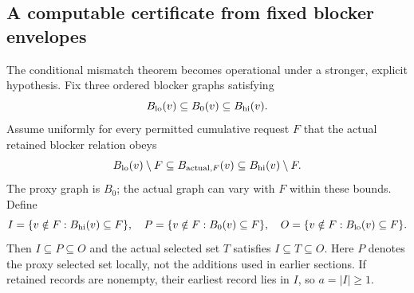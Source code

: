 \documentclass[11pt,a4paper]{article}
\theoremstyle{definition}\newtheorem{definition}[theorem]{Definition}
\newcommand{\minus}{\setminus}
\begin{document}
\subsection{A computable certificate from fixed blocker envelopes}\label{sec:envelopes}
The conditional mismatch theorem becomes operational under a stronger, explicit hypothesis. Fix three ordered blocker graphs satisfying
\[
 B_{\rm lo}(v)\subseteq B_0(v)\subseteq B_{\rm hi}(v).
\]
Assume uniformly for every permitted cumulative request $F$ that the actual retained blocker relation obeys
\[
 B_{\rm lo}(v)\minus F\subseteq B_{{\rm actual},F}(v)
 \subseteq B_{\rm hi}(v)\minus F.
\]
The proxy graph is $B_0$; the actual graph can vary with $F$ within these bounds. Define
\[
 I=\{v\notin F:B_{\rm hi}(v)\subseteq F\},\quad
 P=\{v\notin F:B_0(v)\subseteq F\},\quad
 O=\{v\notin F:B_{\rm lo}(v)\subseteq F\}.
\]
Then $I\subseteq P\subseteq O$ and the actual selected set $T$ satisfies $I\subseteq T\subseteq O$. Here $P$ denotes the proxy selected set locally, not the additions used in earlier sections. If retained records are nonempty, their earliest record lies in $I$, so $a=|I|\ge1$.
\end{document}
